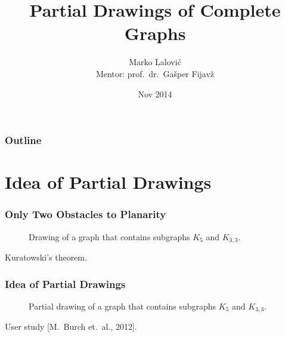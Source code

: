 \documentclass{beamer}
\begin{document}
\title[Partial Drawings of Complete Graphs]{Partial Drawings of Complete Graphs}

\author[Marko Lalović]{
Marko Lalović \\
Mentor: prof.\ dr.\ Gašper Fijavž}

\date{{Nov 2014}}

\begin{frame}
\titlepage
\end{frame}

\begin{frame}
\frametitle{Outline}
\tableofcontents 
\end{frame}


\section{Idea of Partial Drawings}

\begin{frame}
\frametitle{Only Two Obstacles to Planarity}
\begin{figure}[H]
\centering
\resizebox{8cm}{!}{%

}
\caption{Drawing of a graph that contains subgraphs $K_{5}$ and $K_{3,3}$.}
\end{figure}
\footnotesize{Kuratowski’s theorem.}
\end{frame}

\begin{frame}
\frametitle{Idea of Partial Drawings}
\begin{figure}[H]
\centering
\resizebox{8cm}{!}{%

}
\caption{Partial drawing of a graph that contains subgraphs $K_{5}$ and $K_{3,3}$.}
\end{figure}
\footnotesize{User study [M.\ Burch et.\ al., 2012].}
\end{frame}
\end{document}
